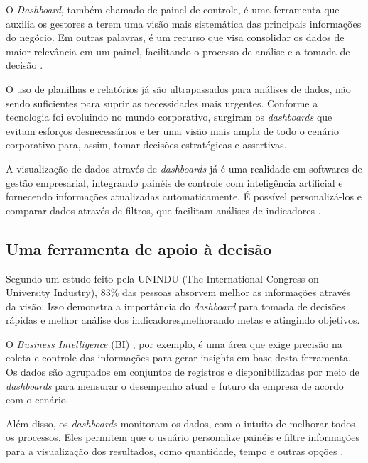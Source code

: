 \indent
\par O \textit{Dashboard}, também chamado de painel de controle, é uma ferramenta que auxilia os gestores a terem uma visão mais sistemática das principais informações do negócio. Em outras palavras, é um recurso que visa consolidar os dados de maior relevância em um painel, facilitando o processo de análise e a tomada de decisão \cite{Intelipost}.

\par O uso de planilhas e relatórios já são ultrapassados para análises de dados, não sendo suficientes para suprir as necessidades mais urgentes. Conforme a tecnologia foi evoluindo no mundo corporativo, surgiram os \textit{dashboards} que evitam esforços desnecessários e ter uma visão mais ampla de todo o cenário corporativo para, assim, tomar decisões estratégicas e assertivas.

\par A visualização de dados através de \textit{dashboards} já é uma realidade em softwares de gestão empresarial, integrando painéis de controle com inteligência artificial e fornecendo informações atualizadas automaticamente. É possível personalizá-los e comparar dados através de filtros, que facilitam análises de indicadores \cite{Tecnicon}.


\subsection{Uma ferramenta de apoio à decisão}

\indent
\par Segundo um estudo feito pela UNINDU (The International Congress on University Industry), 83\% das pessoas absorvem melhor as informações através da visão. Isso demonstra a importância do \textit{dashboard} para tomada de decisões rápidas e melhor análise dos indicadores,melhorando metas e atingindo objetivos.

\par O \textit{Business Intelligence} (BI) \cite{TableauBI}, por exemplo, é uma área que exige precisão na coleta e controle das informações para gerar insights em base desta ferramenta. Os dados são agrupados em conjuntos de registros e disponibilizadas por meio de \textit{dashboards} para mensurar o desempenho atual e futuro da empresa de acordo com o cenário.

\par Além disso, os \textit{dashboards} monitoram os dados, com o intuito de melhorar todos os processos. Eles permitem que o usuário personalize painéis e filtre informações para a visualização dos resultados, como quantidade, tempo e outras opções \cite{Tecnicon}.

